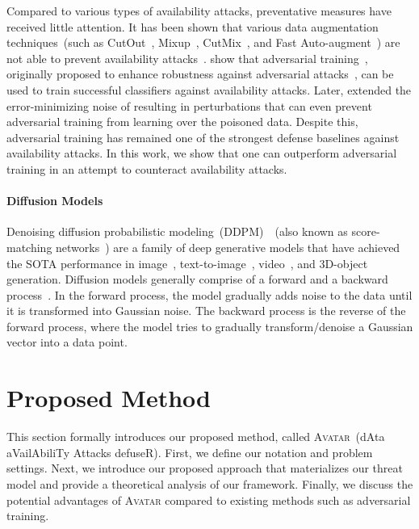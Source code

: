 \documentclass[conference]{IEEEtran}
\theoremstyle{definition}
\theoremstyle{remark}
\theoremstyle{proposition}
\begin{document}
Compared to various types of availability attacks, preventative measures have received little attention.
It has been shown that various data augmentation techniques~(such as CutOut~\citep{devries2017cutout}, Mixup~\citep{zhang2018mixup}, CutMix~\citep{yun2019cutmix}, and Fast Auto-augment~\citep{lim2019autoaugment}) are not able to prevent availability attacks~\citep{huang2021emn, fowl2021tap, tian2022confoundergan, yu2022shr}.
\citet{tao2021preventing} show that adversarial training~\citep{madry2018towards,zhang2019trades,dolatabadi2022ellinf}, originally proposed to enhance robustness against adversarial attacks~\citep{szegedy2014intriguing, goodfellow2014explaining}, can be used to train successful classifiers against availability attacks.
Later, \citet{fu2022remn} extended the error-minimizing noise of \citet{huang2021emn} resulting in perturbations that can even prevent adversarial training from learning over the poisoned data.
Despite this, adversarial training has remained one of the strongest defense baselines against availability attacks.
In this work, we show that one can outperform adversarial training in an attempt to counteract availability attacks.

\paragraph{Diffusion Models}
Denoising diffusion probabilistic modeling~(DDPM)~\citep{sohl2015deep, ho2020ddpm}~(also known as score-matching networks~\citep{song2019generative, song2020improved, song2021scoresde}) are a family of deep generative models that have achieved the SOTA performance in image~\citep{dhariwal2021diffusion, xu2023stable}, text-to-image~\citep{rombach2022stable}, video~\citep{singer2023makeavideo}, and 3D-object~\citep{poole2023dreamfusion} generation.
Diffusion models generally comprise of a forward and a backward process~\citep{croitoru2022diffusion}.
In the forward process, the model gradually adds noise to the data until it is transformed into Gaussian noise.
The backward process is the reverse of the forward process, where the model tries to gradually transform/denoise a Gaussian vector into a data point.

\section{Proposed Method}\label{sec:method}
This section formally introduces our proposed method, called \textsc{Avatar}~(dAta aVailAbiliTy Attacks defuseR).
First, we define our notation and problem settings.
Next, we introduce our proposed approach that materializes our threat model and provide a theoretical analysis of our framework.
Finally, we discuss the potential advantages of \textsc{Avatar} compared to existing methods such as adversarial training.
\end{document}
